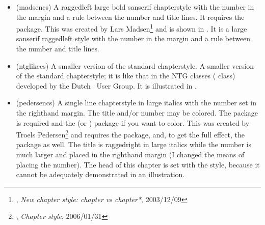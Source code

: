 \begin{itemize}


\item[\cstyle{madsen}] 
\glossary(madsencs)%
  {}%
  {A raggedleft large bold sanserif chapterstyle with the number in the
   margin and a rule between the number and title lines.
   It requires the  package.}
  This was created by 
  Lars Madsen\footnote{\ctt,
  \textit{New chapter style: chapter vs chapter*}, 2003/12/09}
  and is shown in .
  It is a large sanserif raggedleft style with the number in the margin
  and a rule between the number and title lines. 



\item[\cstyle{ntglike}] 
\glossary(ntglikecs)%
  {}%
  { A smaller version of the standard chapterstyle.}
A smaller version of the standard chapterstyle; it is like that in the NTG 
classes ( class) developed by the Dutch \tx\ User Group.
It is illustrated in 
.




\item[\cstyle{pedersen}] 
\glossary(pedersencs)%
  {}%
  {A single line chapterstyle in large italics with the number set in the
  righthand margin. The title and/or number may be colored. The 
   package is required and the  
  (or ) package if you want to color.}
  This was created by
  Troels Pedersen\footnote{\ctt,
  \textit{Chapter style}, 2006/01/31} and requires the 
  package, and, to get the full effect, the  package as well.
  The title is raggedright in large italics while the number is much larger
  and placed in the righthand margin (I changed the means of placing the 
  number). The head of this chapter is set with the  style,
  because it cannot be adequately demonstrated in an illustration.


\end{itemize}

